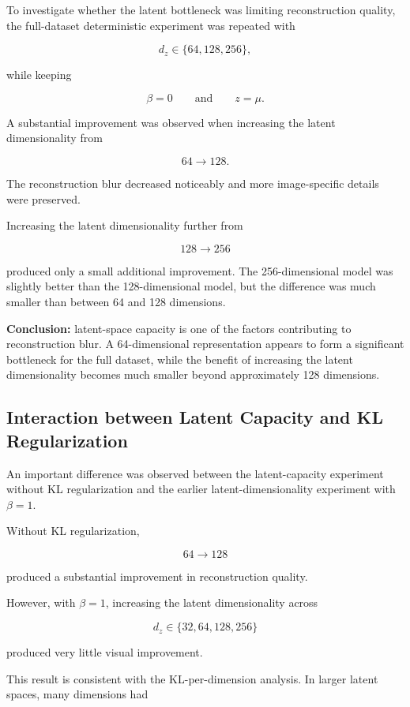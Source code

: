 \documentclass[a4paper,11pt]{article}
\begin{document}
To investigate whether the latent bottleneck was limiting reconstruction quality, the full-dataset deterministic experiment was repeated with

\[
d_z \in \{64,128,256\},
\]

while keeping

\[
\beta=0
\qquad\text{and}\qquad
z=\mu.
\]

A substantial improvement was observed when increasing the latent dimensionality from

\[
64 \rightarrow 128.
\]

The reconstruction blur decreased noticeably and more image-specific details were preserved.

Increasing the latent dimensionality further from

\[
128 \rightarrow 256
\]

produced only a small additional improvement. The 256-dimensional model was slightly better than the 128-dimensional model, but the difference was much smaller than between 64 and 128 dimensions.

\textbf{Conclusion:} latent-space capacity is one of the factors contributing to reconstruction blur. A 64-dimensional representation appears to form a significant bottleneck for the full dataset, while the benefit of increasing the latent dimensionality becomes much smaller beyond approximately 128 dimensions.


\subsection{Interaction between Latent Capacity and KL Regularization}

An important difference was observed between the latent-capacity experiment without KL regularization and the earlier latent-dimensionality experiment with $\beta=1$.

Without KL regularization,

\[
64 \rightarrow 128
\]

produced a substantial improvement in reconstruction quality.

However, with $\beta=1$, increasing the latent dimensionality across

\[
d_z \in \{32,64,128,256\}
\]

produced very little visual improvement.

This result is consistent with the KL-per-dimension analysis. In larger latent spaces, many dimensions had
\end{document}
